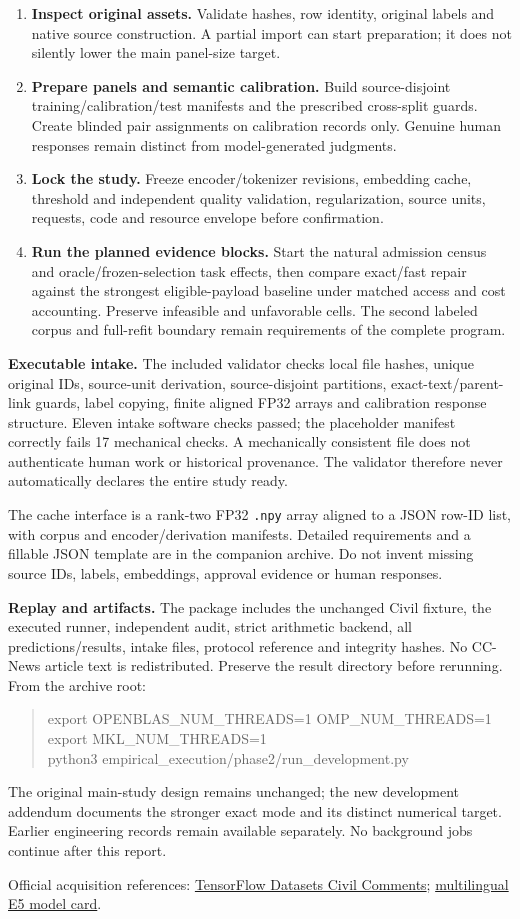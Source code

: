 \documentclass[11pt,a4paper]{article}
\begin{document}
\begin{enumerate}
\item \textbf{Inspect original assets.} Validate hashes, row identity, original
labels and native source construction. A partial import can start preparation;
it does not silently lower the main panel-size target.
\item \textbf{Prepare panels and semantic calibration.} Build source-disjoint
training/calibration/test manifests and the prescribed cross-split guards.
Create blinded pair assignments on calibration records only. Genuine human
responses remain distinct from model-generated judgments.
\item \textbf{Lock the study.} Freeze encoder/tokenizer revisions, embedding
cache, threshold and independent quality validation, regularization, source
units, requests, code and resource envelope before confirmation.
\item \textbf{Run the planned evidence blocks.} Start the natural admission
census and oracle/frozen-selection task effects, then compare exact/fast repair
against the strongest eligible-payload baseline under matched access and cost
accounting. Preserve infeasible and unfavorable cells. The second labeled
corpus and full-refit boundary remain requirements of the complete program.
\end{enumerate}

\textbf{Executable intake.} The included validator checks local file hashes,
unique original IDs, source-unit derivation, source-disjoint partitions,
exact-text/parent-link guards, label copying, finite aligned FP32 arrays and
calibration response structure. Eleven intake software checks passed; the
placeholder manifest correctly fails 17 mechanical checks. A mechanically
consistent file does not authenticate human work or historical provenance.
The validator therefore never automatically declares the entire study ready.

The cache interface is a rank-two FP32 \texttt{.npy} array aligned to a JSON
row-ID list, with corpus and encoder/derivation manifests. Detailed requirements
and a fillable JSON template are in the companion archive. Do not invent
missing source IDs, labels, embeddings, approval evidence or human responses.

\textbf{Replay and artifacts.} The package includes the unchanged Civil
fixture, the executed runner, independent audit, strict arithmetic backend,
all predictions/results, intake files, protocol reference and integrity hashes.
No CC-News article text is redistributed. Preserve the result directory before
rerunning. From the archive root:
\begin{quote}\small\ttfamily
export OPENBLAS\_NUM\_THREADS=1 OMP\_NUM\_THREADS=1\\
export MKL\_NUM\_THREADS=1\\
python3 empirical\_execution/phase2/run\_development.py
\end{quote}
The original main-study design remains unchanged; the new development addendum
documents the stronger exact mode and its distinct numerical target. Earlier
engineering records remain available separately. No background jobs continue
after this report.

\small Official acquisition references:
\href{https://www.tensorflow.org/datasets/catalog/civil_comments}{TensorFlow Datasets Civil Comments};
\href{https://huggingface.co/intfloat/multilingual-e5-base}{multilingual E5 model card}.
\end{document}

